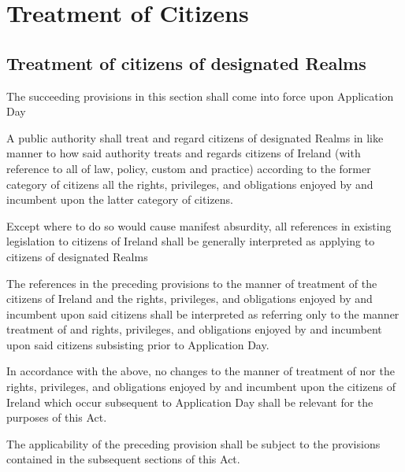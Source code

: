 \documentclass[private]{ukbill}
\begin{document}
\chapter{Treatment of Citizens}
	
\section{Treatment of citizens of designated Realms}


\begin{numstat}
\item The succeeding provisions in this section shall come into force upon Application Day
\item  A public authority shall treat and regard citizens of designated Realms in like manner to how said authority treats and regards  citizens of Ireland (with reference to  all of law, policy, custom and practice) according to the former category of citizens all the rights, privileges, and obligations enjoyed by and incumbent upon the latter category of citizens.
\item Except where to do so would cause manifest absurdity,  all references in existing legislation to citizens of Ireland shall be generally interpreted as applying to citizens of designated Realms
 \begin{alphstat}
\item	The references in the preceding provisions  to the manner of treatment of the citizens of Ireland and the rights, privileges, and obligations enjoyed by and incumbent upon said citizens shall be interpreted as referring only to the manner treatment of and rights, privileges, and obligations enjoyed by and incumbent upon said citizens subsisting prior to Application Day.
\item In accordance with the above, no changes to the manner of treatment of nor the rights, privileges, and obligations enjoyed by and incumbent upon the citizens of Ireland which occur subsequent to Application Day shall be relevant for the purposes of this Act.
	
\end{alphstat}
\item The applicability of the preceding provision shall be subject to the provisions contained in the subsequent sections of this Act. \end{numstat}
\end{document}
